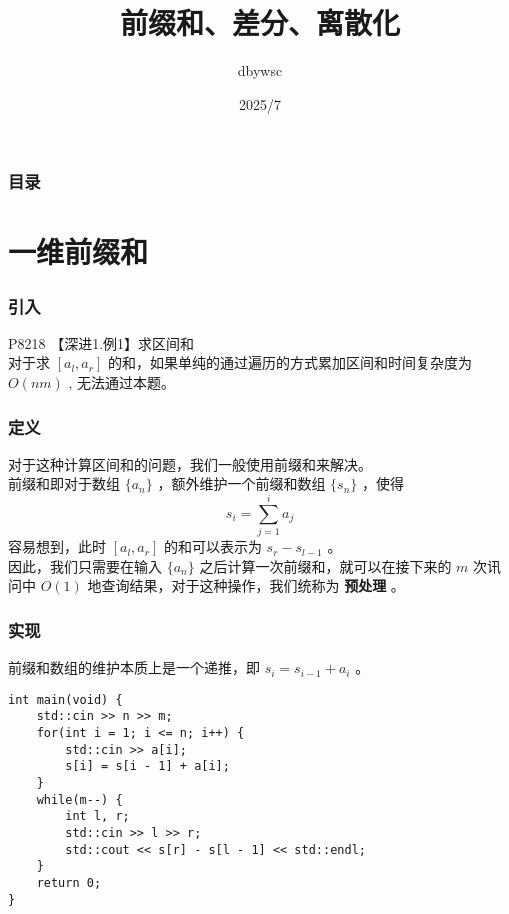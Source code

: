 \documentclass{beamer}
\title{前缀和、差分、离散化}
\author{dbywsc}
\date{2025/7}
\newcommand{\fdf}[1]{\alert{\textbf{#1}}}
\begin{document}
\frame{\titlepage}
\begin{frame}
	\frametitle{目录}
	\tableofcontents
\end{frame}
\section{一维前缀和}
\begin{frame}
\frametitle{引入}
P8218 【深进1.例1】求区间和 \\ 
对于求 $[a_l, a_r]$ 的和，如果单纯的通过遍历的方式累加区间和时间复杂度为 $O(nm)$ , 无法通过本题。
\end{frame}
\begin{frame}
\frametitle{定义}
对于这种计算区间和的问题，我们一般使用前缀和来解决。 \\ 
前缀和即对于数组 $\{a_n\}$ ，额外维护一个前缀和数组 $\{s_n\}$ ，使得
$$s_i = \sum_{j = 1}^{i}a_j $$
容易想到，此时 $[a_l, a_r]$ 的和可以表示为 $s_r - s_{l - 1}$ 。	\\ 
因此，我们只需要在输入 $\{a_n\}$ 之后计算一次前缀和，就可以在接下来的 $m$ 次讯问中 $O(1)$ 地查询结果，对于这种操作，我们统称为 \fdf{预处理} 。
\end{frame}
\begin{frame}[fragile]
\frametitle{实现}
前缀和数组的维护本质上是一个递推，即 $s_i = s_{i - 1} + a_i$ 。
\begin{onlyenv}
\begin{verbatim}
int main(void) {
    std::cin >> n >> m;
    for(int i = 1; i <= n; i++) {
        std::cin >> a[i];
        s[i] = s[i - 1] + a[i];
    }
    while(m--) {
        int l, r;
        std::cin >> l >> r;
        std::cout << s[r] - s[l - 1] << std::endl;
    }
    return 0;
}
\end{verbatim}
\end{onlyenv}
\end{frame}
\end{document}
